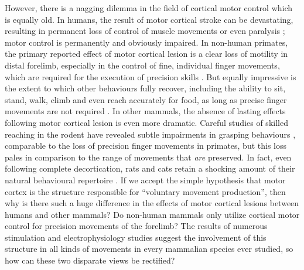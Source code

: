 However, there is a nagging dilemma in the field of cortical motor control which is equally old. In humans, the result of motor cortical stroke can be devastating, resulting in permanent loss of control of muscle movements or even paralysis \cite{Laplane1977}; motor control is permanently and obviously impaired. In non-human primates, the primary reported effect of motor cortical lesion is a clear loss of motility in distal forelimb, especially in the control of fine, individual finger movements, which are required for the execution of precision skills \cite{Leyton1917,Darling2011}. But equally impressive is the extent to which other behaviours fully recover, including the ability to sit, stand, walk, climb and even reach accurately for food, as long as precise finger movements are not required \cite{Leyton1917,Darling2011,Zaaimi2012}. In other mammals, the absence of lasting effects following motor cortical lesion is even more dramatic. Careful studies of skilled reaching in the rodent have revealed subtle impairments in grasping behaviours \cite{Alaverdashvili2008a}, comparable to the loss of precision finger movements in primates, but this loss pales in comparison to the range of movements that \emph{are} preserved. In fact, even following complete decortication, rats and cats retain a shocking amount of their natural behavioural repertoire \cite{Bjursten1976,Terry1989}. If we accept the simple hypothesis that motor cortex is the structure responsible for ``voluntary movement production'', then why is there such a huge difference in the effects of motor cortical lesions between humans and other mammals? Do non-human mammals only utilize cortical motor control for precision movements of the forelimb? The results of numerous stimulation and electrophysiology studies suggest the involvement of this structure in all kinds of movements in every mammalian species ever studied, so how can these two disparate views be rectified?

